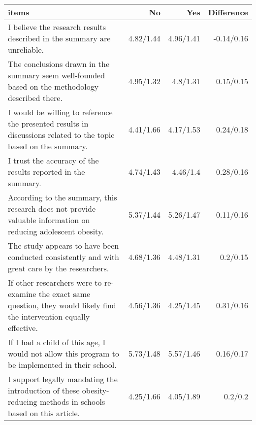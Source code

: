 \begin{longtable}{lrrr}
\toprule
items & No & Yes & Difference \\ 
\midrule\addlinespace[2.5pt]
I believe the research results described in the summary are unreliable. & 4.82/1.44 & 4.96/1.41 & -0.14/0.16 \\ 
The conclusions drawn in the summary seem well-founded based on the methodology described there. & 4.95/1.32 & 4.8/1.31 & 0.15/0.15 \\ 
I would be willing to reference the presented results in discussions related to the topic based on the summary. & 4.41/1.66 & 4.17/1.53 & 0.24/0.18 \\ 
I trust the accuracy of the results reported in the summary. & 4.74/1.43 & 4.46/1.4 & 0.28/0.16 \\ 
According to the summary, this research does not provide valuable information on reducing adolescent obesity. & 5.37/1.44 & 5.26/1.47 & 0.11/0.16 \\ 
The study appears to have been conducted consistently and with great care by the researchers. & 4.68/1.36 & 4.48/1.31 & 0.2/0.15 \\ 
If other researchers were to re-examine the exact same question, they would likely find the intervention equally effective. & 4.56/1.36 & 4.25/1.45 & 0.31/0.16 \\ 
If I had a child of this age, I would not allow this program to be implemented in their school. & 5.73/1.48 & 5.57/1.46 & 0.16/0.17 \\ 
I support legally mandating the introduction of these obesity-reducing methods in schools based on this article. & 4.25/1.66 & 4.05/1.89 & 0.2/0.2 \\ 
\bottomrule
\end{longtable}

